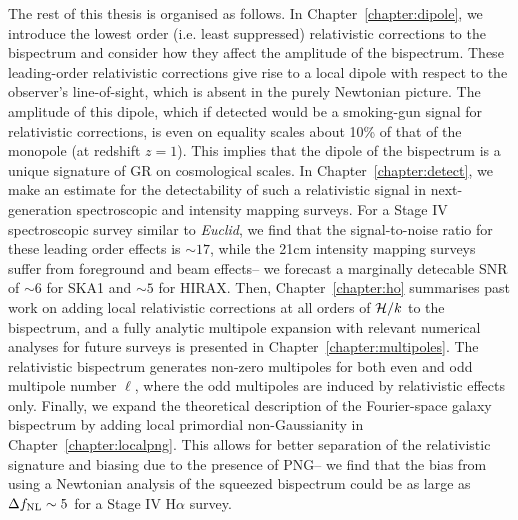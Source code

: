 The rest of this thesis is organised as follows. In Chapter~\ref{chapter:dipole}, we introduce the lowest order (i.e. least suppressed) relativistic corrections to the bispectrum and consider how they affect the amplitude of the bispectrum. These leading-order relativistic corrections give rise to a local dipole with respect to the observer's line-of-sight, which is absent in the purely Newtonian picture. The amplitude of this dipole, which if detected would be a smoking-gun signal for relativistic corrections, is even on equality scales about 10\% of that of the monopole (at redshift $z = 1$). This implies that the dipole of the bispectrum is a unique signature of GR on cosmological scales. In Chapter~\ref{chapter:detect}, we make an estimate for the detectability of such a relativistic signal in next-generation spectroscopic and intensity mapping surveys. For a Stage IV spectroscopic survey similar to \textit{Euclid}, we find that the signal-to-noise ratio for these leading order effects is $\sim 17$, while the 21cm intensity mapping surveys suffer from foreground and beam effects-- we forecast a marginally detecable SNR of $\sim 6$ for SKA1 and $\sim 5$ for HIRAX. Then, Chapter~\ref{chapter:ho} summarises past work on adding local relativistic corrections at all orders of $\mathcal{H}/k$ to the bispectrum, and a fully analytic multipole expansion with relevant numerical analyses for future surveys is presented in Chapter~\ref{chapter:multipoles}. The relativistic bispectrum generates non-zero multipoles for both even and odd multipole number $\ell$, where the odd multipoles are induced by relativistic effects only. Finally, we expand the theoretical description of the Fourier-space galaxy bispectrum by adding local primordial non-Gaussianity in Chapter~\ref{chapter:localpng}. This allows for better separation of the relativistic signature and biasing due to the presence of PNG-- we find that the bias from using a Newtonian analysis of the squeezed bispectrum could be as large as $\Delta f_{\mathrm{NL}} \sim 5$ for a Stage IV H$\alpha$ survey. 